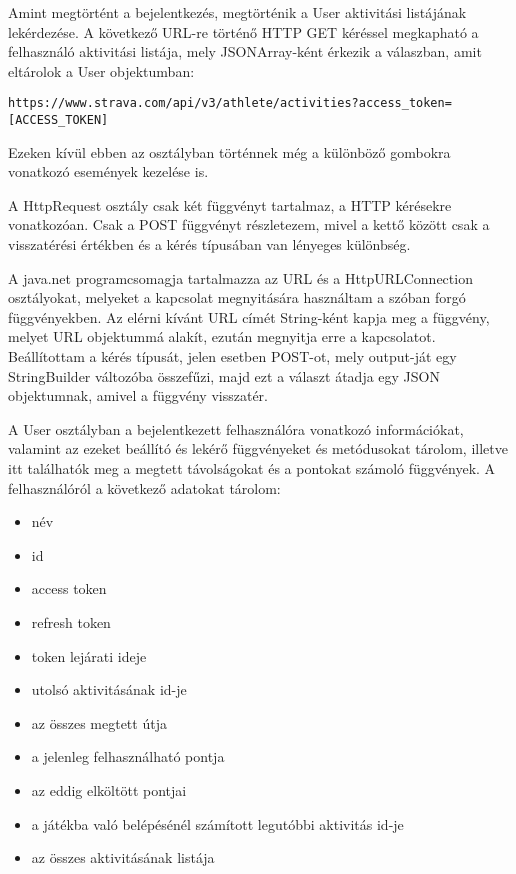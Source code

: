Amint megtörtént a bejelentkezés, megtörténik a User aktivitási listájának lekérdezése. A következő URL-re történő HTTP GET kéréssel megkapható a felhasználó aktivitási listája, mely JSONArray-ként érkezik a válaszban, amit eltárolok a User objektumban:

\begin{verbatim}
https://www.strava.com/api/v3/athlete/activities?access_token=[ACCESS_TOKEN] 
\end{verbatim}


Ezeken kívül ebben az osztályban történnek még a különböző gombokra vonatkozó események kezelése is. 

A HttpRequest osztály csak két függvényt tartalmaz, a HTTP kérésekre vonatkozóan. Csak a POST függvényt részletezem, mivel a kettő között csak a visszatérési értékben és a kérés típusában van lényeges különbség. 

A java.net programcsomagja tartalmazza az URL és a HttpURLConnection osztályokat, melyeket a kapcsolat megnyitására használtam a szóban forgó függvényekben. Az elérni kívánt URL címét String-ként kapja meg a függvény, melyet URL objektummá alakít, ezután megnyitja erre a kapcsolatot. Beállítottam a kérés típusát, jelen esetben POST-ot, mely output-ját egy StringBuilder változóba összefűzi, majd ezt a választ átadja egy JSON objektumnak, amivel a függvény visszatér. 

A User osztályban a bejelentkezett felhasználóra vonatkozó információkat, valamint az ezeket beállító és lekérő függvényeket és metódusokat tárolom, illetve itt találhatók meg a megtett távolságokat és a pontokat számoló függvények. A felhasználóról a következő adatokat tárolom: 

\begin{itemize}
\item név 
\item id 
\item access token 
\item refresh token 
\item token lejárati ideje 
\item utolsó aktivitásának id-je 
\item az összes megtett útja 
\item a jelenleg felhasználható pontja 
\item az eddig elköltött pontjai 
\item a játékba való belépésénél számított legutóbbi aktivitás id-je 
\item az összes aktivitásának listája
\end{itemize}

